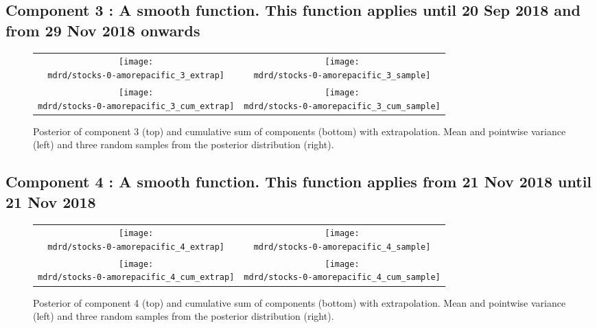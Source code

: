 \documentclass{article} %
\begin{document}
\subsection{Component 3 : A smooth function. This function applies until 20 Sep 2018 and from 29 Nov 2018 onwards}



\begin{figure}[H]
\newcommand{\wmgd}{0.5\columnwidth}
\newcommand{\hmgd}{3.0cm}
\newcommand{\mdrd}{stocks-0-amorepacific}
\newcommand{\mbm}{\hspace{-0.3cm}}
\begin{tabular}{cc}
\mbm \texttt{[image: \\mdrd/stocks-0-amorepacific\_3\_extrap]} & \texttt{[image: \\mdrd/stocks-0-amorepacific\_3\_sample]} \\
\mbm \texttt{[image: \\mdrd/stocks-0-amorepacific\_3\_cum\_extrap]} & \texttt{[image: \\mdrd/stocks-0-amorepacific\_3\_cum\_sample]}
\end{tabular}
\caption{Posterior of component 3 (top) and cumulative sum of components (bottom) with extrapolation. Mean and pointwise variance (left) and three random samples from the posterior distribution (right).}
\label{fig:extrap3}
\end{figure}

\subsection{Component 4 : A smooth function. This function applies from 21 Nov 2018 until 21 Nov 2018}



\begin{figure}[H]
\newcommand{\wmgd}{0.5\columnwidth}
\newcommand{\hmgd}{3.0cm}
\newcommand{\mdrd}{stocks-0-amorepacific}
\newcommand{\mbm}{\hspace{-0.3cm}}
\begin{tabular}{cc}
\mbm \texttt{[image: \\mdrd/stocks-0-amorepacific\_4\_extrap]} & \texttt{[image: \\mdrd/stocks-0-amorepacific\_4\_sample]} \\
\mbm \texttt{[image: \\mdrd/stocks-0-amorepacific\_4\_cum\_extrap]} & \texttt{[image: \\mdrd/stocks-0-amorepacific\_4\_cum\_sample]}
\end{tabular}
\caption{Posterior of component 4 (top) and cumulative sum of components (bottom) with extrapolation. Mean and pointwise variance (left) and three random samples from the posterior distribution (right).}
\label{fig:extrap4}
\end{figure}
\end{document}
